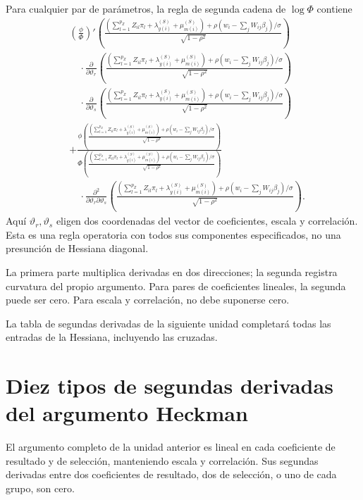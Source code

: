 \documentclass[11pt,a4paper]{article}
\begin{document}
Para cualquier par de parámetros,
la regla de segunda cadena
de \(\log\Phi\) contiene
\[
\begin{aligned}
&\left(\frac{\phi}{\Phi}\right)'
\left(\frac{\left(\sum_{l=1}^{p_Z}Z_{il}\pi_l+\lambda_{y(i)}^{(S)}+\mu_{m(i)}^{(S)}\right)+\rho(w_i-\sum_jW_{ij}\beta_j)/\sigma}
{\sqrt{1-\rho^2}}\right)\\
&\quad\cdot\frac{\partial}{\partial\vartheta_r}
\left(\frac{\left(\sum_{l=1}^{p_Z}Z_{il}\pi_l+\lambda_{y(i)}^{(S)}+\mu_{m(i)}^{(S)}\right)+\rho(w_i-\sum_jW_{ij}\beta_j)/\sigma}
{\sqrt{1-\rho^2}}\right)\\
&\quad\cdot\frac{\partial}{\partial\vartheta_s}
\left(\frac{\left(\sum_{l=1}^{p_Z}Z_{il}\pi_l+\lambda_{y(i)}^{(S)}+\mu_{m(i)}^{(S)}\right)+\rho(w_i-\sum_jW_{ij}\beta_j)/\sigma}
{\sqrt{1-\rho^2}}\right)\\
&+\frac{\phi\left(\frac{\left(\sum_{l=1}^{p_Z}Z_{il}\pi_l+\lambda_{y(i)}^{(S)}+\mu_{m(i)}^{(S)}\right)+\rho(w_i-\sum_jW_{ij}\beta_j)/\sigma}
{\sqrt{1-\rho^2}}\right)}
{\Phi\left(\frac{\left(\sum_{l=1}^{p_Z}Z_{il}\pi_l+\lambda_{y(i)}^{(S)}+\mu_{m(i)}^{(S)}\right)+\rho(w_i-\sum_jW_{ij}\beta_j)/\sigma}
{\sqrt{1-\rho^2}}\right)}\\
&\quad\cdot\frac{\partial^2}{\partial\vartheta_r\partial\vartheta_s}
\left(\frac{\left(\sum_{l=1}^{p_Z}Z_{il}\pi_l+\lambda_{y(i)}^{(S)}+\mu_{m(i)}^{(S)}\right)+\rho(w_i-\sum_jW_{ij}\beta_j)/\sigma}
{\sqrt{1-\rho^2}}\right).
\end{aligned}
\]
Aquí \(\vartheta_r,\vartheta_s\) eligen dos coordenadas
del vector de coeficientes, escala y correlación.
Esta es una regla operatoria
con todos sus componentes
especificados, no una
presunción de Hessiana diagonal.

La primera parte multiplica
derivadas en dos direcciones;
la segunda registra curvatura
del propio argumento.
Para pares de coeficientes
lineales, la segunda puede ser cero.
Para escala y correlación,
no debe suponerse cero.

La tabla de segundas derivadas
de la siguiente unidad
completará todas las
entradas de la Hessiana,
incluyendo las cruzadas.


\clearpage
\section{Diez tipos de segundas derivadas del argumento Heckman}

El argumento completo de
la unidad anterior es
lineal en cada coeficiente
de resultado y de selección,
manteniendo escala y correlación.
Sus segundas derivadas entre
dos coeficientes de resultado,
dos de selección, o uno
de cada grupo, son cero.
\end{document}
